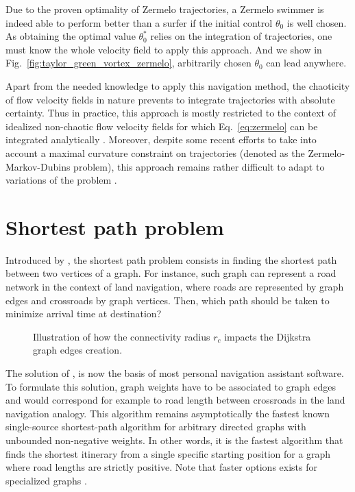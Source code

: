 Due to the proven optimality of Zermelo trajectories, a Zermelo swimmer is indeed able to perform better than a surfer if the initial control $\theta_0$ is well chosen.
As obtaining the optimal value $\theta_0^*$ relies on the integration of trajectories, one must know the whole velocity field to apply this approach.
And we show in Fig.~\ref{fig:taylor_green_vortex_zermelo}, arbitrarily chosen $\theta_0$ can lead anywhere.

Apart from the needed knowledge to apply this navigation method, the chaoticity of flow velocity fields in nature prevents to integrate trajectories with absolute certainty.
Thus in practice, this approach is mostly restricted to the context of idealized non-chaotic flow velocity fields for which Eq.~\eqref{eq:zermelo} can be integrated analytically \citep{liebchen2019optimal}.
Moreover, despite some recent efforts to take into account a maximal curvature constraint on trajectories (denoted as the Zermelo-Markov-Dubins problem), this approach remains rather difficult to adapt to variations of the problem \citep{caillau2019zermelo, sacchelli2021zermelo}.

\section{Shortest path problem}\label{sec:shortest_path}

Introduced by \citet{dijkstra1959note}, the shortest path problem consists in finding the shortest path between two vertices of a graph.
For instance, such graph can represent a road network in the context of land navigation, where roads are represented by graph edges and crossroads by graph vertices.
Then, which path should be taken to minimize arrival time at destination?
\begin{figure}
	\centering
	\def\svgwidth{0.8\textwidth}
	
  	\caption{
  		Illustration of how the connectivity radius $r_c$ impacts the Dijkstra graph edges creation.
  	}
  	\label{fig:dijkstra_edges}
\end{figure}

The solution of \citet{dijkstra1959note}, is now the basis of most personal navigation assistant software.
To formulate this solution, graph weights have to be associated to graph edges and would correspond for example to road length between crossroads in the land navigation analogy.
This algorithm remains asymptotically the fastest known single-source shortest-path algorithm for arbitrary directed graphs with unbounded non-negative weights.
In other words, it is the fastest algorithm that finds the shortest itinerary from a single specific starting position for a graph where road lengths are strictly positive.
Note that faster options exists for specialized graphs \citep{dial1969algorithm, thorup2000ram}.

